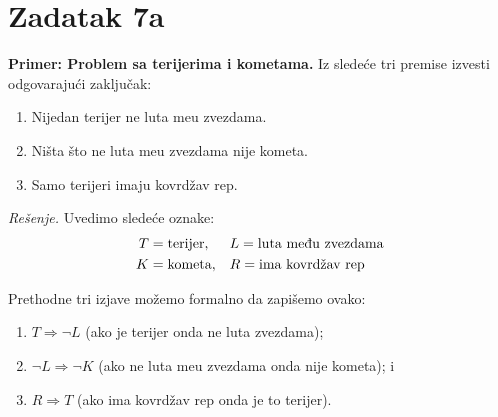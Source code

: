 \documentclass[10pt,a4paper]{article}
\newcommand{\astop}{\mathop{\displaystyle\mathrm{\ast}}}
\begin{document}








\section{Zadatak 7a}

\textbf{Primer: Problem sa terijerima i kometama.} Iz slede\'ce tri premise izvesti
odgovaraju\'ci zaklju\v{c}ak:

\begin{enumerate}
    \item Nijedan terijer ne luta me\dj u zvezdama.
    \item Ni\v{s}ta \v{s}to ne luta me\dj u zvezdama nije kometa.
    \item Samo terijeri imaju kovrd\v{z}av rep.
\end{enumerate}

\noindent
\textit{Re\v{s}enje.} Uvedimo slede\'ce oznake:
\begin{align*}
    T &= \text{terijer}, &&L = \text{luta me\dj u zvezdama} \\
    K &= \text{kometa}, &&R = \text{ima kovrd\v{z}av rep}
\end{align*}

\noindent
Prethodne tri izjave mo\v{z}emo formalno da zapi\v{s}emo ovako:
\begin{enumerate}
    \item $T \Rightarrow \neg L$ (ako je terijer onda ne luta zvezdama);
    \item $\neg L \Rightarrow \neg K$ (ako ne luta me\dj u zvezdama onda nije kometa); i 
    \item $R \Rightarrow T$ (ako ima kovrd\v{z}av rep onda je to terijer).
\end{enumerate}
\end{document}
